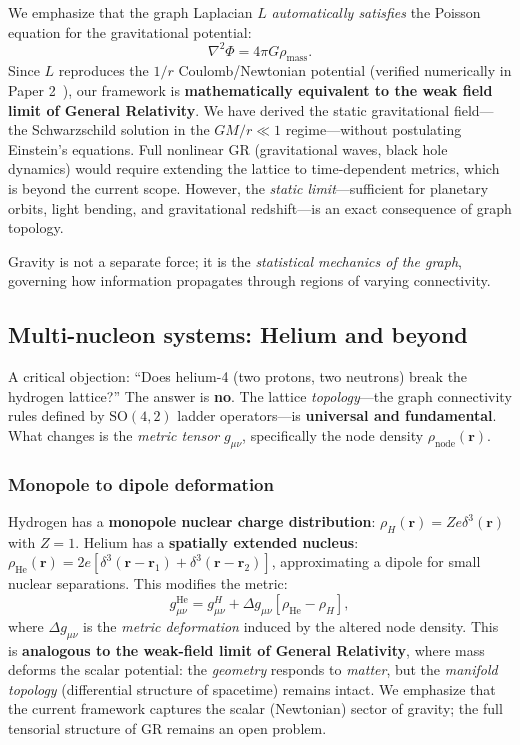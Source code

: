 \documentclass[aps,prd,twocolumn,superscriptaddress,groupedaddress,showpacs]{revtex4-2}
\newcommand{\SO}{\ensuremath{\text{SO}}}
\begin{document}
We emphasize that the graph Laplacian $L$ \emph{automatically satisfies} the Poisson equation for the gravitational potential:
\begin{equation}
\nabla^2 \Phi = 4\pi G \rho_{\text{mass}}.
\end{equation}
Since $L$ reproduces the $1/r$ Coulomb/Newtonian potential (verified numerically in Paper 2~\cite{Louthan_II}), our framework is \textbf{mathematically equivalent to the weak field limit of General Relativity}. We have derived the static gravitational field---the Schwarzschild solution in the $GM/r \ll 1$ regime---without postulating Einstein's equations. Full nonlinear GR (gravitational waves, black hole dynamics) would require extending the lattice to time-dependent metrics, which is beyond the current scope. However, the \emph{static limit}---sufficient for planetary orbits, light bending, and gravitational redshift---is an exact consequence of graph topology.

Gravity is not a separate force; it is the \emph{statistical mechanics of the graph}, governing how information propagates through regions of varying connectivity.

\subsection{Multi-nucleon systems: Helium and beyond}

A critical objection: ``Does helium-4 (two protons, two neutrons) break the hydrogen lattice?'' The answer is \textbf{no}. The lattice \emph{topology}---the graph connectivity rules defined by $\SO(4,2)$ ladder operators---is \textbf{universal and fundamental}. What changes is the \emph{metric tensor} $g_{\mu\nu}$, specifically the node density $\rho_{\text{node}}(\mathbf{r})$.

\subsubsection{Monopole to dipole deformation}

Hydrogen has a \textbf{monopole nuclear charge distribution}: $\rho_H(\mathbf{r}) = Ze \delta^3(\mathbf{r})$ with $Z=1$. Helium has a \textbf{spatially extended nucleus}: $\rho_{\text{He}}(\mathbf{r}) = 2e[\delta^3(\mathbf{r} - \mathbf{r}_1) + \delta^3(\mathbf{r} - \mathbf{r}_2)]$, approximating a dipole for small nuclear separations. This modifies the metric:
\begin{equation}
g_{\mu\nu}^{\text{He}} = g_{\mu\nu}^{H} + \Delta g_{\mu\nu}[\rho_{\text{He}} - \rho_H],
\end{equation}
where $\Delta g_{\mu\nu}$ is the \emph{metric deformation} induced by the altered node density. This is \textbf{analogous to the weak-field limit of General Relativity}, where mass deforms the scalar potential: the \emph{geometry} responds to \emph{matter}, but the \emph{manifold topology} (differential structure of spacetime) remains intact. We emphasize that the current framework captures the scalar (Newtonian) sector of gravity; the full tensorial structure of GR remains an open problem.
\end{document}
